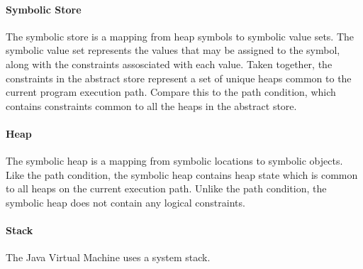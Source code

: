 \paragraph{Symbolic Store}
The symbolic store is a mapping from heap symbols to symbolic value sets. The symbolic value set represents the values that may be assigned to the symbol, along with the constraints assosciated with each value. Taken together, the constraints in the abstract store represent a set of unique heaps common to the current program execution path. Compare this to the path condition, which contains constraints common to all the heaps in the abstract store.
\paragraph{Heap}
The symbolic heap is a mapping from symbolic locations to symbolic objects. Like the path condition, the symbolic heap contains heap state which is common to all heaps on the current execution path. Unlike the path condition, the symbolic heap does not contain any logical constraints.
\paragraph{Stack}
The Java Virtual Machine uses a system stack.